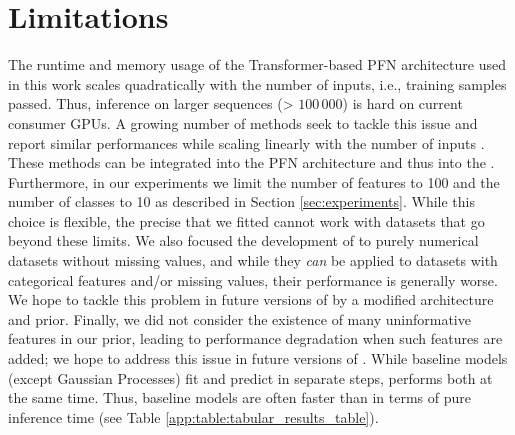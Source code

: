 \documentclass{article}
\begin{document}





\newpage
\appendix

\section{Limitations}
\label{sec:limitations}
The runtime and memory usage of the Transformer-based PFN architecture used in this work scales quadratically with the number of inputs, i.e., training samples passed. Thus, inference on larger sequences (> $100\,000$) is hard on current consumer GPUs. A growing number of methods seek to tackle this issue and report similar performances while scaling linearly with the number of inputs \citep{zaheer2020big, beltagy2020longformer}. These methods can be integrated into the PFN architecture and thus into the \methodname{}.
Furthermore, in our experiments we limit the number of features to 100 and the number of classes to 10 as described in Section \ref{sec:experiments}. While this choice is flexible, the precise \methodname{} that we fitted cannot work with datasets that go beyond these limits.
We also focused the development of \methodname{} to purely numerical datasets without missing values, and while they \emph{can} be applied to datasets with categorical features and/or missing values, their performance is generally worse. We hope to tackle this problem in future versions of \methodname{} by a modified architecture and prior. Finally, we did not consider the existence of many uninformative features in our prior, leading to performance degradation when such features are added; we hope to address this issue in future versions of \methodname{}.
While baseline models (except Gaussian Processes) fit and predict in separate steps, \methodname{} performs both at the same time. Thus, baseline models are often faster than \methodname{} in terms of pure inference time (see Table \ref{app:table:tabular_results_table}).
\end{document}
